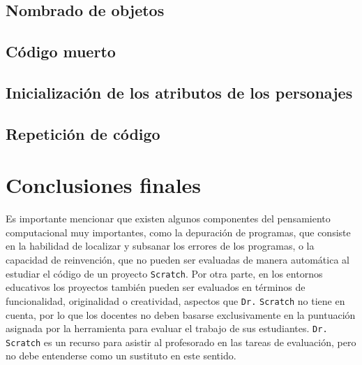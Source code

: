 \documentclass[a4paper,10pt]{article}
\begin{document}
\subsection{Nombrado de objetos}
\subsection{Código muerto}
\subsection{Inicialización de los atributos de los personajes}
\subsection{Repetición de código}

\section{Conclusiones finales}
Es importante mencionar que existen algunos componentes del pensamiento computacional muy importantes, como la depuración de programas, que consiste en la habilidad de localizar y subsanar los errores de los programas, o la capacidad de reinvención, que no pueden ser evaluadas de manera automática al estudiar el código de un proyecto \texttt{Scratch}. Por otra parte, en los entornos educativos los proyectos también pueden ser evaluados en términos de funcionalidad, originalidad o creatividad, aspectos que \texttt{Dr.}{\tiny{ }}\texttt{Scratch} no tiene en cuenta, por lo que los docentes no deben basarse exclusivamente en la puntuación asignada por la herramienta para evaluar el trabajo de sus estudiantes. \texttt{Dr.}{\tiny{ }}\texttt{Scratch} es un recurso para asistir al profesorado en las tareas de evaluación, pero no debe entenderse como un sustituto en este sentido.
\end{document}
